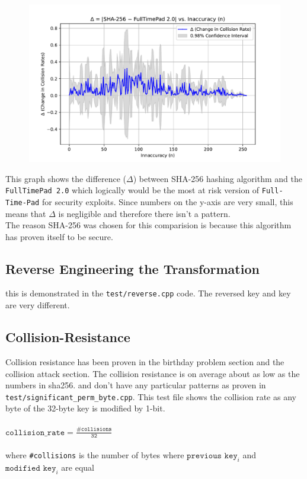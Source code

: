 \documentclass[fleqn, a4paper,12pt]{article}
\begin{document}
\begin{figure}[H]
    \includegraphics[width=0.9\linewidth]{delta sha256 - fulltimepad 2.0.pdf}
    \centering
\end{figure}

This graph shows the difference ($\Delta$) between SHA-256 hashing algorithm and the \texttt{FullTimePad 2.0} which logically would be the most at risk version of \texttt{Full-Time-Pad} for security exploits. Since numbers on the y-axis are very small, this means that $\Delta$ is negligible and therefore there isn't a pattern.
\\
The reason SHA-256 was chosen for this comparision is because this algorithm has proven itself to be secure.


\subsection{Reverse Engineering the Transformation}

this is demonstrated in the \texttt{test/reverse.cpp} code. The reversed key and key are very different.

\subsection{Collision-Resistance}

Collision resistance has been proven in the birthday problem section and the collision attack section. The collision resistance is on average about as low as the numbers in sha256. and don't have any particular patterns as proven in \texttt{test/significant\_perm\_byte.cpp}. This test file shows the collision rate as any byte of the 32-byte key is modified by 1-bit.
\\\\
$\texttt{collision\_rate} = \frac{\texttt{\#collisions}}{\texttt{32}}$\\
 \\ where \texttt{\#collisions} is the number of bytes where $\texttt{previous key}_i$ and $\texttt{modified key}_i$ are equal
\end{document}
